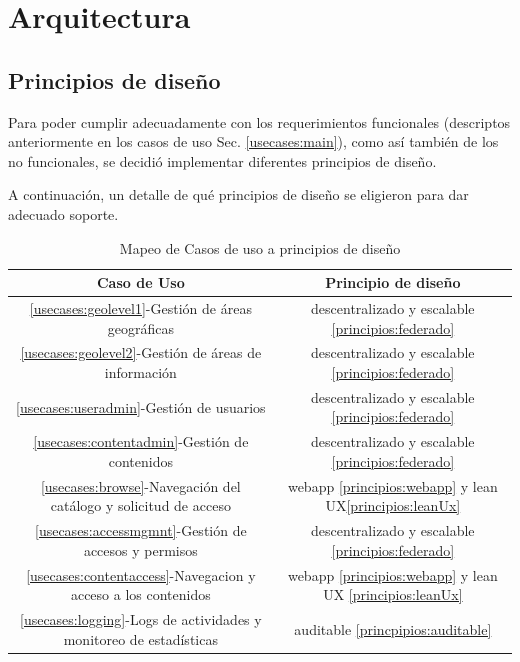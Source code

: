 \chapter{Arquitectura}
\section{Principios de diseño}

Para poder cumplir adecuadamente con los requerimientos funcionales (descriptos anteriormente en los casos de uso Sec. \ref{usecases:main}), como así también de los no funcionales, se decidió implementar diferentes principios de diseño.


A continuación, un detalle de qué principios de diseño se eligieron para dar adecuado soporte.

\begin{table} 
    \centering
    \begin{tabular}{|c|c|}\hline
         Caso de Uso&  Principio de diseño\\\hline
         \ref{usecases:geolevel1}-Gestión de áreas geográficas&  descentralizado y escalable \ref{principios:federado}\\\hline
         \ref{usecases:geolevel2}-Gestión de áreas de información&  descentralizado y escalable \ref{principios:federado}\\\hline
         \ref{usecases:useradmin}-Gestión de usuarios&  descentralizado y escalable \ref{principios:federado}\\\hline
         \ref{usecases:contentadmin}-Gestión de contenidos&  descentralizado y escalable \ref{principios:federado}\\\hline
         \ref{usecases:browse}-Navegación del catálogo y solicitud de acceso&  webapp \ref{principios:webapp} y lean UX\ref{principios:leanUx}\\\hline             
         \ref{usecases:accessmgmnt}-Gestión de accesos y permisos&  descentralizado y escalable \ref{principios:federado}\\\hline 
         \ref{usecases:contentaccess}-Navegacion y acceso a los contenidos&  webapp \ref{principios:webapp} y lean UX \ref{principios:leanUx}\\\hline          
         \ref{usecases:logging}-Logs de actividades y monitoreo de estadísticas& auditable \ref{princpipios:auditable}\\\hline          
    \end{tabular}
    \caption{Mapeo de Casos de uso a principios de diseño}
    \label{tab:usecasesxdesignprinciples}
\end{table}

